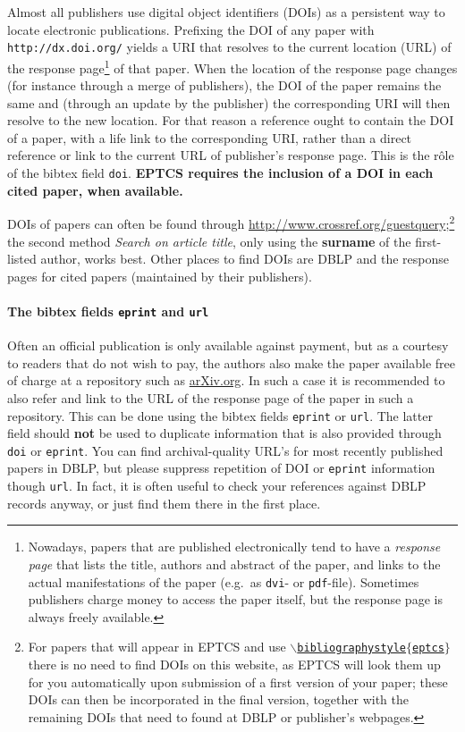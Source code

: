 \documentclass[submission,copyright,creativecommons]{eptcs}
\begin{document}
Almost all publishers use digital object identifiers (DOIs) as a
persistent way to locate electronic publications. Prefixing the DOI of
any paper with {\tt http://dx.doi.org/} yields a URI that resolves to the
current location (URL) of the response page\footnote{Nowadays, papers
  that are published electronically tend
  to have a \emph{response page} that lists the title, authors and
  abstract of the paper, and links to the actual manifestations of
  the paper (e.g.\ as {\tt dvi}- or {\tt pdf}-file). Sometimes
  publishers charge money to access the paper itself, but the response
  page is always freely available.}
of that paper. When the location of the response page changes (for
instance through a merge of publishers), the DOI of the paper remains
the same and (through an update by the publisher) the corresponding
URI will then resolve to the new location. For that reason a reference
ought to contain the DOI of a paper, with a life link to the corresponding
URI, rather than a direct reference or link to the current URL of
publisher's response page. This is the r\^ole of the bibtex field {\tt doi}.
{\bf EPTCS requires the inclusion of a DOI in each cited paper, when available.}

DOIs of papers can often be found through
\url{http://www.crossref.org/guestquery};\footnote{For papers that will appear
  in EPTCS and use \href{http://eptcs.web.cse.unsw.edu.au/eptcs.bst}
  {\tt $\backslash$bibliographystyle$\{$eptcs$\}$} there is no need to
  find DOIs on this website, as EPTCS will look them up for you
  automatically upon submission of a first version of your paper;
  these DOIs can then be incorporated in the final version, together
  with the remaining DOIs that need to found at DBLP or publisher's webpages.}
the second method {\it Search on article title}, only using the {\bf
surname} of the first-listed author, works best.  
Other places to find DOIs are DBLP and the response pages for cited
papers (maintained by their publishers).

\paragraph{The bibtex fields {\tt eprint} and {\tt url}}

Often an official publication is only available against payment, but
as a courtesy to readers that do not wish to pay, the authors also
make the paper available free of charge at a repository such as
\url{arXiv.org}. In such a case it is recommended to also refer and
link to the URL of the response page of the paper in such a
repository.  This can be done using the bibtex fields {\tt eprint}
or {\tt url}.  The latter field should \textbf{not} be used
to duplicate information that is also provided through {\tt doi} or {\tt eprint}.
You can find archival-quality URL's for most recently published papers
in DBLP, but please suppress repetition of DOI or {\tt eprint} information though {\tt url}.
In fact, it is often useful to check your references against DBLP records anyway,
or just find them there in the first place.
\end{document}
